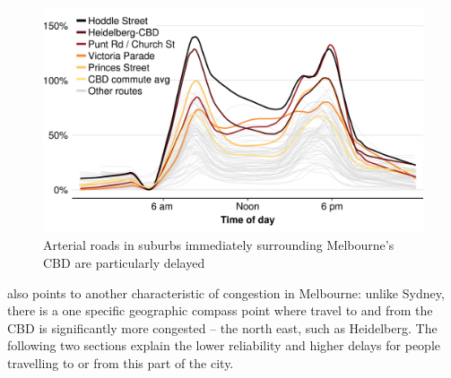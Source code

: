 \documentclass{grattan}
\begin{document}
\begin{figure}
\caption{Arterial roads in suburbs immediately surrounding Melbourne's CBD are particularly delayed}\label{fig:HoddleStreet-vs-time_of_day}
\includegraphics[width=1.1\columnwidth]{atlas/HoddleStreet-vs-others-1.pdf}
\end{figure}

 also points to another characteristic of congestion in Melbourne: unlike Sydney, there is a one specific geographic compass point where travel to and from the CBD is significantly more congested -- the north east, such as Heidelberg.
The following two sections explain the lower reliability and higher delays for people travelling to or from this part of the city.










%
\end{document}
